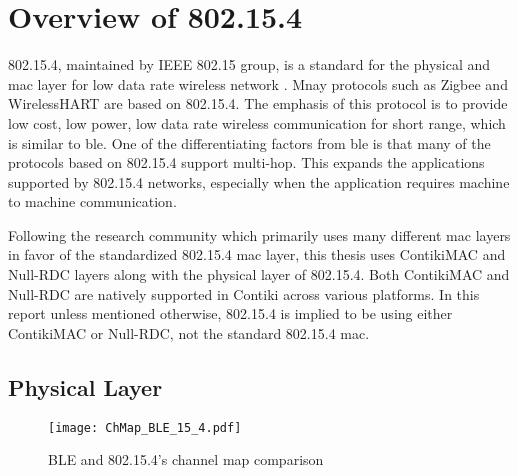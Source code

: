 

\section{Overview of 802.15.4} \label{Overview15.4}
802.15.4, maintained by IEEE 802.15 group, is a standard for the physical and \gls{mac} layer for low data rate wireless network \cite{IEEE802154}. Mnay protocols such as Zigbee and WirelessHART are based on 802.15.4. The emphasis of this protocol is to provide low cost, low power, low data rate wireless communication for short range, which is similar to \gls{ble}. One of the differentiating factors from \gls{ble} is that many of the protocols based on 802.15.4 support multi-hop. This expands the applications supported by 802.15.4 networks, especially when the application requires machine to machine communication.

Following the research community which primarily uses many different \gls{mac} layers in favor of the standardized 802.15.4 \gls{mac} layer, this thesis uses ContikiMAC and Null-RDC layers along with the physical layer of 802.15.4. Both ContikiMAC and Null-RDC are natively supported in Contiki across various platforms. In this report unless mentioned otherwise, 802.15.4 is implied to be using either ContikiMAC or Null-RDC, not the standard 802.15.4 \gls{mac}.

\subsection{Physical Layer}
\begin{figure}[h]
\centering
\texttt{[image: ChMap\_BLE\_15\_4.pdf]}
\caption{BLE and 802.15.4's channel map comparison}
\label{fig:ChMap}
\end{figure}

